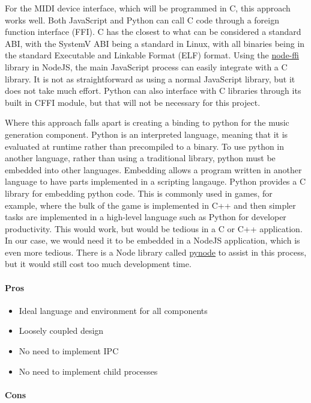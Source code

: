 For the MIDI device interface, which will be programmed in C, this approach works well.
Both JavaScript and Python can call C code through a foreign function interface (FFI). C
has the closest to what can be considered a standard ABI, with the SystemV ABI being a
standard in Linux, with all binaries being in the standard Executable and Linkable Format
(ELF) format. Using the \url{node-ffi} library in NodeJS, the main JavaScript process can
easily integrate with a C library. It is not as straightforward as using a normal
JavaScript library, but it does not take much effort. Python can also interface with C
libraries through its built in CFFI module, but that will not be necessary for this
project.

Where this approach falls apart is creating a binding to python for the music generation
component. Python is an interpreted language, meaning that it is evaluated at runtime
rather than precompiled to a binary. To use python in another language, rather than using
a traditional library, python must be embedded into other languages. Embedding allows a
program written in another language to have parts implemented in a scripting langauge.
Python provides a C library for embedding python code. This is commonly used in games, for
example, where the bulk of the game is implemented in C++ and then simpler tasks are
implemented in a high-level language such as Python for developer productivity. This would
work, but would be tedious in a C or C++ application. In our case, we would need it to be
embedded in a NodeJS application, which is even more tedious. There is a Node library
called \url{pynode} to assist in this process, but it would still cost too much
development time.

\paragraph{Pros}

\begin{itemize}
  \item Ideal language and environment for all components
  \item Loosely coupled design
  \item No need to implement IPC
  \item No need to implement child processes
\end{itemize}

\paragraph{Cons}

